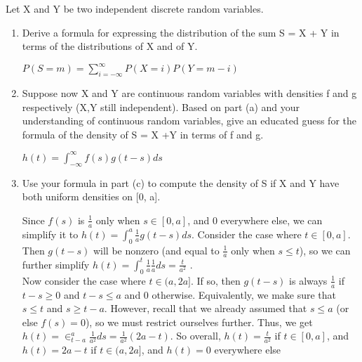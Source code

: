 \question Let X and Y be two independent discrete random variables. 
\begin{enumerate}[label=(\alph*)]
\item
Derive a formula for expressing the distribution of the sum S = X + Y in terms 
of the distributions of X and of Y.
\begin{solution}[.3cm]
$P(S=m) = \sum_{i=-\infty}^\infty P(X = i)P(Y=m-i)$
\end{solution}

\item  Suppose now X and Y are continuous random variables with 
densities f and g respectively (X,Y still independent). Based on part 
(a) and your understanding of continuous random variables, give an 
educated guess for the formula of the density of S = X +Y in terms of f and g.
\begin{solution}[.3cm]
$ h(t) = \int_{-\infty}^\infty f(s) g(t-s) ds $
\end{solution}

\item Use your formula in part (c) to compute the density of S if X 
and Y have both uniform densities on [0, a].
\begin{solution}[1cm]
Since $f(s)$ is $\frac{1}{a}$ only when $s \in [0, a]$, and 0 everywhere 
else, we can simplify it to $h(t) = \int_0^a \frac{1}{a} g(t-s) ds$. 
Consider the case where $t \in [0,a]$. Then $g(t-s)$ will be nonzero 
(and equal to $\frac{1}{a}$ only when $s \leq t$), so we can further 
simplify $h(t) = \int_0^t \frac{1}{a} \frac{1}{a} ds = \frac{t}{a^2}$ . \\
Now consider the case where $t \in (a, 2a]$. If so, then $g(t-s)$ is 
always $\frac{1}{a}$ if $t-s\geq 0$ and $t-s\leq a$ and 0 otherwise. 
Equivalently, we make sure that $s\leq t$ and $s \geq t-a$. However, 
recall that we already assumed that $s \leq a$ (or else $f(s) = 0$), 
so we must restrict ourselves further. Thus, we get $h(t) = \in_{t-a}^a 
\frac{1}{a^2} ds = \frac{1}{a^2} (2a-t)$. So overall, $h(t) = 
\frac{t}{a^2}$ if $t \in [0, a]$, and $h(t) = 2a-t$ if $t \in (a, 2a]$, 
and $h(t) = 0$ everywhere else

\end{solution}

\end{enumerate}
